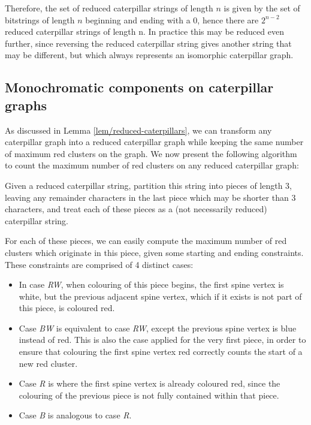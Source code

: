 \documentclass{mpaper}
\begin{document}
Therefore, the set of reduced caterpillar strings of length $n$ is given by the set of bitstrings of length $n$ beginning and ending with a $0$, hence there are $2^{n-2}$ reduced caterpillar strings of length n. In practice this may be reduced even further, since reversing the reduced caterpillar string gives another string that may be different, but which always represents an isomorphic caterpillar graph.

\subsection{Monochromatic components on caterpillar graphs}

As discussed in Lemma \ref{lem/reduced-caterpillars}, we can transform any caterpillar graph into a reduced caterpillar graph while keeping the same number of maximum red clusters on the graph. We now present the following algorithm to count the maximum number of red clusters on any reduced caterpillar graph:

Given a reduced caterpillar string, partition this string into pieces of length 3, leaving any remainder characters in the last piece which may be shorter than 3 characters, and treat each of these pieces as a (not necessarily reduced) caterpillar string.

For each of these pieces, we can easily compute the maximum number of red clusters which originate in this piece, given some starting and ending constraints. These constraints are comprised of 4 distinct cases:

\begin{itemize}
  \item In case \emph{RW}, when colouring of this piece begins, the first spine vertex is white, but the previous adjacent spine vertex, which if it exists is not part of this piece, is coloured red.
  \item Case \emph{BW} is equivalent to case \emph{RW}, except the previous spine vertex is blue instead of red. This is also the case applied for the very first piece, in order to ensure that colouring the first spine vertex red correctly counts the start of a new red cluster.
  \item Case \emph{R} is where the first spine vertex is already coloured red, since the colouring of the previous piece is not fully contained within that piece.
  \item Case \emph{B} is analogous to case \emph{R}.
\end{itemize}
\end{document}
